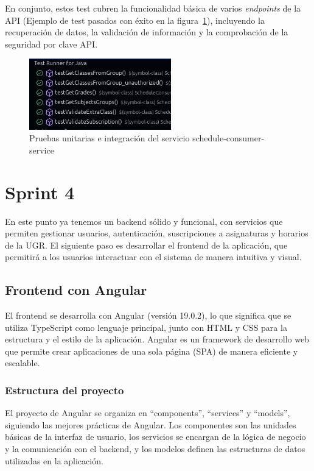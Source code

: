 En conjunto, estos test cubren la funcionalidad básica de varios \textit{endpoints} de la API (Ejemplo de test pasados con éxito en la figura~\ref{test}), incluyendo la recuperación de datos, la validación de información y la comprobación de la seguridad por clave API.

\begin{figure}[H]
    \centering
    \includegraphics[width=0.55\textwidth]{figures/07_test.png}
    \caption{Pruebas unitarias e integración del servicio schedule-consumer-service}
    \label{test}
\end{figure}

\section{Sprint 4}

En este punto ya tenemos un backend sólido y funcional, con servicios que permiten gestionar usuarios, autenticación, suscripciones a asignaturas y horarios de la UGR. El siguiente paso es desarrollar el frontend de la aplicación, que permitirá a los usuarios interactuar con el sistema de manera intuitiva y visual.
\subsection{Frontend con Angular}
El frontend se desarrolla con Angular (versión 19.0.2), lo que significa que se utiliza TypeScript como lenguaje principal, junto con HTML y CSS para la estructura y el estilo de la aplicación. Angular es un framework de desarrollo web que permite crear aplicaciones de una sola página (SPA) de manera eficiente y escalable.
\subsubsection{Estructura del proyecto}
El proyecto de Angular se organiza en ``components'', ``services'' y ``models'', siguiendo las mejores prácticas de Angular. Los componentes son las unidades básicas de la interfaz de usuario, los servicios se encargan de la lógica de negocio y la comunicación con el backend, y los modelos definen las estructuras de datos utilizadas en la aplicación.
